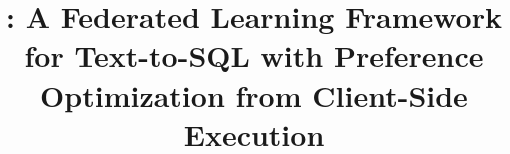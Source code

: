 \documentclass[pdflatex,sn-basic,Numbered]{sn-jnl}
\begin{document}
\title[\method]{\method: A Federated Learning Framework for Text-to-SQL with Preference Optimization from Client-Side Execution}

\author*[1]{ }

\abstract{}

\keywords{}

\maketitle









\backmatter



\begin{appendices}


\end{appendices}


\end{document}
